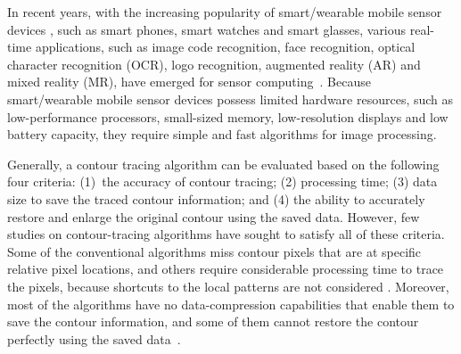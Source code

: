 \documentclass[sensors,article,accept,moreauthors,pdftex,10pt,a4paper]{mdpi}
\begin{document}

In recent years, with the increasing popularity of smart/wearable mobile sensor devices \cite{Aroca2013Wearable}, such as smart phones, smart watches and smart glasses, various real-time applications, such as image code recognition, face recognition, optical character recognition (OCR), logo recognition, augmented reality (AR) and mixed reality (MR), have emerged for sensor computing~\cite{Wakaumi20062D,Brodic2010Basic,Kim2006Rapid,Tian2010RealTime,Zhang2012Robust}. Because smart/wearable mobile sensor devices possess limited hardware resources, such as low-performance processors, small-sized memory, low-resolution displays and low battery capacity, they require simple and fast algorithms for image processing. 


Generally, a contour tracing algorithm can be evaluated based on the following four criteria: (1)~the accuracy of contour tracing; (2) processing time; (3) data size to save the traced contour information; and (4) the ability to accurately restore and enlarge the original contour using the saved data. However, few studies on contour-tracing algorithms have sought to satisfy all of these criteria. Some of the conventional algorithms miss contour pixels that are at specific relative pixel locations, and others require considerable processing time to trace the pixels, because shortcuts to the local patterns are not considered \cite{Cheong2006Improved,Cheong2012Advanced}. Moreover, most of the algorithms have no data-compression capabilities that enable them to save the contour information, and some of them cannot restore the contour perfectly using the saved data~\cite{Miyatake1997Contour}. 
\end{document}
